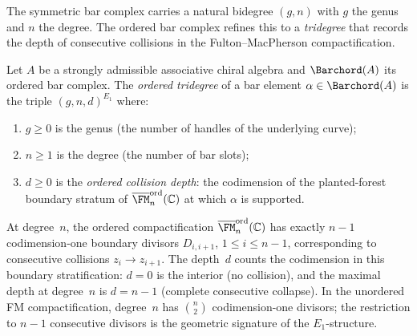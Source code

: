The symmetric bar complex carries a natural bidegree $(g,n)$
with $g$ the genus and $n$ the degree. The ordered bar complex
refines this to a \emph{tridegree} that records the depth of
consecutive collisions in the Fulton--MacPherson compactification.

\begin{definition}
\ClaimStatusProvedHere
\label{def:ordered-tridegree}
Let $A$ be a strongly admissible associative chiral algebra and
$\Barchord(A)$ its ordered bar complex.
The \emph{ordered tridegree} of a bar element
$\alpha \in \Barchord(A)$ is the triple
$(g,n,d)^{E_1}$ where:
\begin{enumerate}[label=\textup{(\roman*)}]
\item $g \geq 0$ is the genus (the number of handles of the
 underlying curve);
\item $n \geq 1$ is the degree (the number of bar slots);
\item $d \geq 0$ is the \emph{ordered collision depth}: the
 codimension of the planted-forest boundary stratum of
 $\overline{\FM}_n^{\mathrm{ord}}(\mathbb{C})$ at which
 $\alpha$ is supported.
\end{enumerate}
At degree~$n$, the ordered compactification
$\overline{\FM}_n^{\mathrm{ord}}(\mathbb{C})$ has exactly $n{-}1$
codimension-one boundary divisors $D_{i,i+1}$, $1 \leq i \leq n{-}1$,
corresponding to consecutive collisions $z_i \to z_{i+1}$. The
depth~$d$ counts the codimension in this boundary stratification:
$d = 0$ is the interior (no collision), and the maximal depth at
degree~$n$ is $d = n{-}1$ (complete consecutive collapse). In the
unordered FM compactification, degree~$n$ has $\binom{n}{2}$
codimension-one divisors; the restriction to $n{-}1$ consecutive
divisors is the geometric signature of the $E_1$-structure.
\end{definition}

